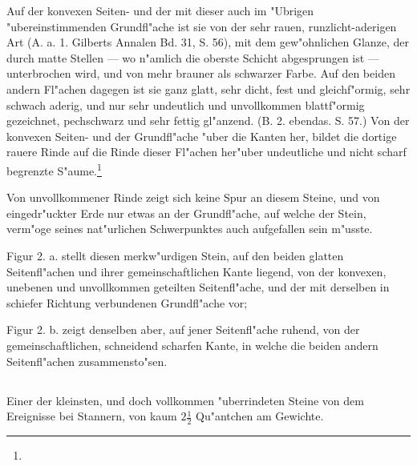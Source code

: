 \documentclass[a4paper, 11pt, oneside, german]{article}
\begin{document}
Auf der konvexen Seiten- und der mit dieser auch im "Ubrigen "ubereinstimmenden Grundfl"ache ist sie von der sehr rauen, runzlicht-aderigen Art (A. a. 1. Gilberts Annalen Bd. 31, S. 56), mit dem gew"ohnlichen Glanze, der durch matte Stellen --- wo n"amlich die oberste Schicht abgesprungen ist --- unterbrochen wird, und von mehr brauner als schwarzer Farbe. Auf den beiden andern Fl"achen dagegen ist sie ganz glatt, sehr dicht, fest und gleichf"ormig, sehr schwach aderig, und nur sehr undeutlich und unvollkommen blattf"ormig gezeichnet, pechschwarz und sehr fettig gl"anzend. (B. 2. ebendas. S. 57.) Von der konvexen Seiten- und der Grundfl"ache "uber die Kanten her, bildet die dortige rauere Rinde auf die Rinde dieser Fl"achen her"uber undeutliche und nicht scharf begrenzte S"aume.\footnote{}

Von unvollkommener Rinde zeigt sich keine Spur an diesem Steine, und von eingedr"uckter Erde nur etwas an der Grundfl"ache, auf welche der Stein, verm"oge seines nat"urlichen Schwerpunktes auch aufgefallen sein m"usste.

Figur 2. a. stellt diesen merkw"urdigen Stein, auf den beiden glatten Seitenfl"achen und ihrer gemeinschaftlichen Kante liegend, von der konvexen, unebenen und unvollkommen geteilten Seitenfl"ache, und der mit derselben in schiefer Richtung verbundenen Grundfl"ache vor;

Figur 2. b. zeigt denselben aber, auf jener Seitenfl"ache ruhend, von der gemeinschaftlichen, schneidend scharfen Kante, in welche die beiden andern Seitenfl"achen zusammensto"sen.

\subsection{}
\paragraph{}
Einer der kleinsten, und doch vollkommen "uberrindeten Steine von dem Ereignisse bei Stannern, von kaum $2\frac{1}{2}$ Qu"antchen am Gewichte.
\end{document}
